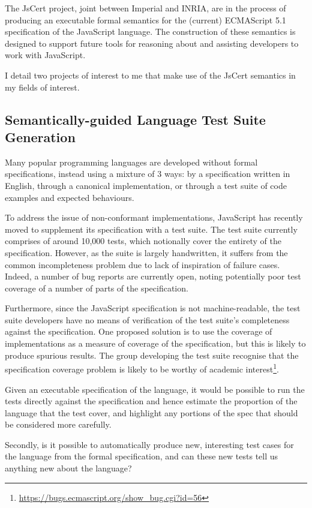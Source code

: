 \documentclass[a4paper]{article}
\begin{document}
The JsCert project, joint between Imperial and INRIA, are in the process of
producing an executable formal semantics for the (current) ECMAScript 5.1
specification of the JavaScript language.
The construction of these semantics is designed to support future tools for
reasoning about and assisting developers to work with JavaScript.

I detail two projects of interest to me that make use of the JsCert semantics in
my fields of interest.

\subsection{Semantically-guided Language Test Suite Generation}
Many popular programming languages are developed without formal specifications,
instead using a mixture of 3 ways: by a specification written in English,
through a canonical implementation, or through a test suite of code examples and
expected behaviours.

To address the issue of non-conformant implementations, JavaScript has recently
moved to supplement its specification with a test suite. The test suite
currently comprises of around 10,000 tests, which notionally cover the entirety
of the specification. However, as the suite is largely handwritten, it suffers
from the common incompleteness problem due to lack of inspiration of failure
cases. Indeed, a number of bug reports are currently open, noting potentially
poor test coverage of a number of parts of the specification.

Furthermore, since the JavaScript specification is not machine-readable, the
test suite developers have no means of verification of the test suite's
completeness against the specification. One proposed solution is to use the
coverage of implementations as a measure of coverage of the specification, but
this is likely to produce spurious results. The group developing the test suite
recognise that the specification coverage problem is likely to be worthy of
academic interest\footnote{\url{https://bugs.ecmascript.org/show_bug.cgi?id=56}}.

Given an executable specification of the language, it would be possible to run
the tests directly against the specification and hence estimate the proportion
of the language that the test cover, and highlight any portions of the spec
that should be considered more carefully.

Secondly, is it possible to automatically produce new, interesting test cases
for the language from the formal specification, and can these new tests tell us
anything new about the language? %
\end{document}
